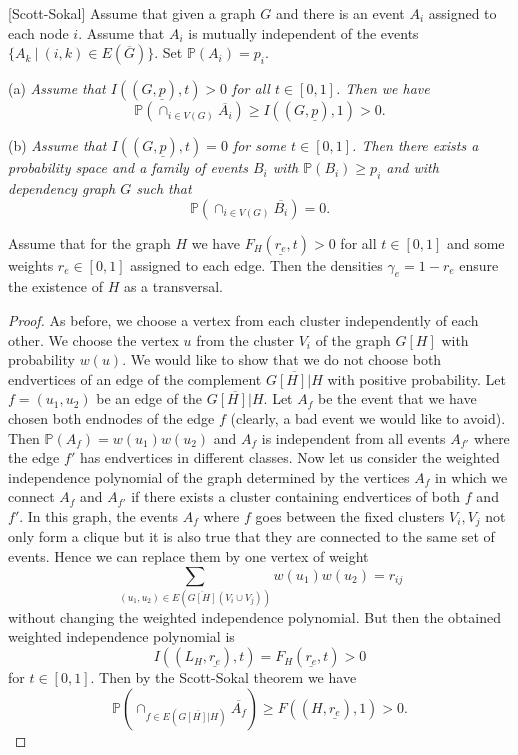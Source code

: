 \documentclass[12pt,a4paper]{amsart}
\numberwithin{equation}{section}
\begin{document}
\begin{theorem}{\rm \label{Ath1}[Scott-Sokal] \cite{sokal1} }
Assume that
given a graph $G$ and there is an event  $A_i$ assigned to each node
$i$. Assume that $A_i$ is mutually independent of the events $\{A_k\ |\ (i,k)\in
E(\overline{G})\}$. Set $\mathbb{P}(A_i)=p_i$.
\medskip

\noindent (a)  \textit{Assume that $I((G,\underline{p}),t)>0$ for all $t\in
[0,1]$. Then we have }
$$\mathbb{P}(\cap_{i\in V(G)} \overline{A_i})\geq I((G,\underline{p}),1)>0.$$
\medskip

\noindent (b)  \textit{Assume that $I((G,\underline{p}),t)=0$ for some $t\in
  [0,1]$. 
Then there exists a probability space and a family of events $B_i$ with
$\mathbb{P}(B_i)\geq p_i$ and with dependency graph $G$ such that}
$$\mathbb{P}(\cap_{i\in V(G)} \overline{B_i})=0.$$

\end{theorem}

\begin{theorem} \label{C1} Assume that for the  graph $H$ we have
  $F_H(\underline{r_e},t)>0$ 
  for all $t\in [0,1]$ and some weights $r_e\in [0,1]$ assigned to each
  edge. Then the densities $\gamma_e=1-r_e$ ensure the existence of $H$ as a
  transversal. 
\end{theorem}

\begin{proof} As before, we choose a vertex from each cluster independently
  of each other. We choose the vertex $u$ from the cluster $V_i$ of the graph
  $G[H]$ with probability $w(u)$. We would like to show that we do not choose
  both endvertices  of an edge of the complement $\overline{G[H]|H}$ with
  positive probability.  Let $f=(u_1,u_2)$ be an edge of
the $\overline{G[H]|H}$. Let $A_f$ be the event
that we have chosen both endnodes of the edge $f$ (clearly, a bad event we would
like to avoid). Then $\mathbb{P}(A_f)=w(u_1)w(u_2)$ and $A_f$ is independent
from all events $A_{f'}$ where the edge $f'$ has endvertices in different
classes. Now let us consider the weighted independence polynomial of the graph
determined by the vertices $A_f$ in which we connect $A_f$ and $A_{f'}$ if there
exists a cluster containing endvertices of both $f$ and $f'$. In this graph,
the events $A_f$ where $f$ 
goes between the fixed clusters $V_i,V_j$  not only form a clique but it is also
true that they are connected to the same set of events. Hence we can replace
them by one vertex of weight 
$$\sum_{(u_1,u_2)\in E(\overline{G[H]}(V_i\cup V_j))}w(u_1)w(u_2)=r_{ij}$$
without changing the weighted independence polynomial. But then the obtained
weighted independence polynomial is
$$I((L_H,\underline{r_e}),t)=F_{H}(\underline{r_e},t)>0$$
for $t\in [0,1]$. Then by the Scott-Sokal theorem we have
$$\mathbb{P}(\cap_{f\in E(\overline{G[H]|H})} \overline{A_f})\geq
F((H,\underline{r_e}),1)>0.$$
\end{proof}
\end{document}
